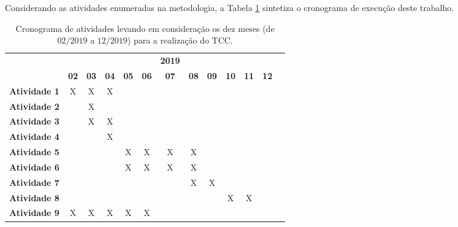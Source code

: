 Considerando as atividades enumeradas na metodologia, a Tabela \ref{tab:cronograma} sintetiza o cronograma de execução deste trabalho.

\begin{table}
\caption{Cronograma de atividades levando em consideração os dez meses (de $02/2019$ a $12/2019$) para a realização do TCC.}
\label{tab:cronograma}

\begin{center}
\begin{small}
\begin{tabular}{p{5cm}cccccccccccc}
  \toprule
  & &  &  & &  & \textbf{2019}  & &  &  &  &  & \\
                                        & \textbf{02} & \textbf{03} & \textbf{04} & \textbf{05} & \textbf{06} & \textbf{07} & \textbf{08} & \textbf{09} & \textbf{10} & \textbf{11} & \textbf{12} \\
  \midrule

  \textbf{Atividade 1}                     &      X      &      X      &      X      &           &             &             &             &             &             &             &             \\
  \textbf{Atividade 2} &             &      X      &            &             &             &             &             &             &             &             &             \\
  \textbf{Atividade 3}         &             &     X        &    X         &            &            &            &            &            &             &             &             \\
  \textbf{Atividade 4}         &             &             &    X         &            &            &            &            &            &             &             &             \\
  \textbf{Atividade 5}         &             &             &             &      X      &       X     &   X         &     X       &            &             &             &             \\
  \textbf{Atividade 6}         &             &             &             &      X      &     X       &     X       &    X        &            &             &             &             \\
  \textbf{Atividade 7}         &             &             &             &            &            &            &      X      &      X      &             &             &             \\
  \textbf{Atividade 8}         &             &             &             &            &            &            &           &            &   X          &      X       &             \\
  \textbf{Atividade 9}          &      X      &      X      &      X      &      X      &      X      &             &             &             &             &             &             \\


\end{tabular}
\end{small}
\end{center}
\end{table}
